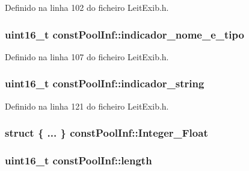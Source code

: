 Definido na linha 102 do ficheiro Leit\-Exib.\-h.

\hypertarget{structconst_pool_inf_adcd281157000a467608ba65cf1a6efb6}{
\subsubsection[{indicador\-\_\-nome\-\_\-e\-\_\-tipo}]{\setlength{\rightskip}{0pt plus 5cm}uint16\-\_\-t const\-Pool\-Inf\-::indicador\-\_\-nome\-\_\-e\-\_\-tipo}}\label{structconst_pool_inf_adcd281157000a467608ba65cf1a6efb6}


Definido na linha 107 do ficheiro Leit\-Exib.\-h.

\hypertarget{structconst_pool_inf_a0d09a4566d526db83cd87836f18df28c}{
\subsubsection[{indicador\-\_\-string}]{\setlength{\rightskip}{0pt plus 5cm}uint16\-\_\-t const\-Pool\-Inf\-::indicador\-\_\-string}}\label{structconst_pool_inf_a0d09a4566d526db83cd87836f18df28c}


Definido na linha 121 do ficheiro Leit\-Exib.\-h.

\hypertarget{structconst_pool_inf_a9cc60d2e41859cb617704d61374ddb74}{
\subsubsection[{Integer\-\_\-\-Float}]{\setlength{\rightskip}{0pt plus 5cm}struct \{ ... \}   const\-Pool\-Inf\-::\-Integer\-\_\-\-Float}}\label{structconst_pool_inf_a9cc60d2e41859cb617704d61374ddb74}
\hypertarget{structconst_pool_inf_a3c4be7f5456b58187d9695bb1d3c8871}{
\subsubsection[{length}]{\setlength{\rightskip}{0pt plus 5cm}uint16\-\_\-t const\-Pool\-Inf\-::length}}\label{structconst_pool_inf_a3c4be7f5456b58187d9695bb1d3c8871}


